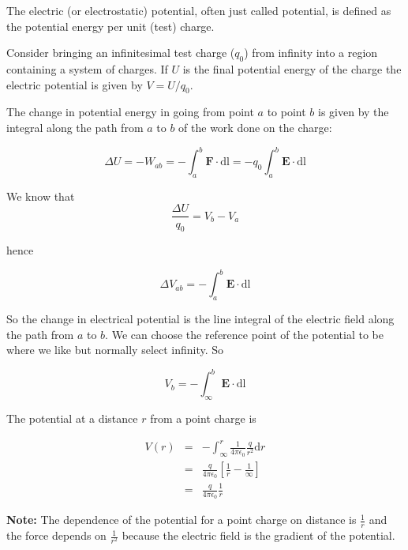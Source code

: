 \documentclass[
]{book}
\numberwithin{equation}{section}
\begin{document}
The electric (or electrostatic) potential, often just called potential,
is defined as the potential energy per unit (test) charge.

Consider bringing an infinitesimal test charge (\(q_0\)) from infinity
into a region containing a system of charges. If \(U\) is the final
potential energy of the charge the electric potential is given by
\(V = U/q_0\).

The change in potential energy in going from point \(a\) to point \(b\) is
given by the integral along the path from \(a\) to \(b\) of the work done on
the charge:

\begin{equation}
\label{eq:DeltaU}
\Delta U = - W_{ab} = -\int_a^b \mathbf{F} \cdot \mathrm{d}\mathrm{l} = -q_0 \int_a^b \mathbf{E} \cdot \mathrm{d}\mathrm{l}
\end{equation}

We know that
\begin{equation}
\label{eq:DeltaU2}
\frac{\Delta U}{q_0} = V_b - V_a
\end{equation}

hence

\begin{equation}
\label{eq:DeltaVab}
\Delta V_{ab} = -\int_a^b \mathbf{E} \cdot \mathrm{d}\mathrm{l}
\end{equation}

So the change in electrical potential is the line integral of the
electric field along the path from \(a\) to \(b\). We can choose the
reference point of the potential to be where we like but normally select
infinity. So

\begin{equation}
\label{eq:Vb}
V_b = -\int_\infty^b \mathbf{E} \cdot \mathrm{d}\mathrm{l}
\end{equation}

The potential at a distance \(r\) from a point charge is

\begin{equation}
\label{eq:V-r}
\begin{array}{rcll}
V(r) &=& -\int_\infty^r \frac{1}{4\pi\epsilon_0} \frac{q}{r^2} \mathrm{d} r \\
     &=& \frac{q}{4\pi\epsilon_0} \left[ \frac{1}{r} - \frac{1}{\infty} \right] \\
     &=& \frac{q}{4\pi\epsilon_0} \frac{1}{r}
\end{array}
\end{equation}

\textbf{Note:} The dependence of the potential for a point charge on distance
is \(\frac{1}{r}\) and the force depends on \(\frac{1}{r^2}\) because the
electric field is the gradient of the potential.
\end{document}
